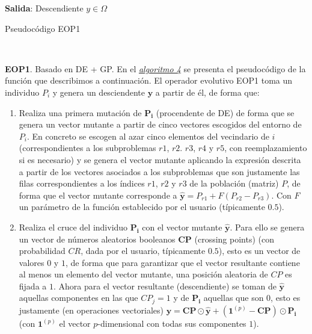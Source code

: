 \begin{minipage}{\textwidth}
\begin{algorithm}[H]
         \vspace{0.2cm}\textbf{Salida}: Descendiente $y \in \Omega$
     \caption{Pseudocódigo EOP1}
     \label{alg:4}
    \end{algorithm}
     \end{minipage}\\ \vspace{0.2cm}
    
    \noindent\textbf{EOP1}. Basado en DE + GP. En el \hyperref[alg:4]{\textit{algoritmo 4}} se presenta el pseudocódigo de la función que describimos a continuación. El operador evolutivo EOP1 toma un individuo $P_i$ y genera un desciendente $\boldsymbol{y}$ a partir de él, de forma que:\\
    
    \begin{enumerate}
        \item Realiza una primera mutación de $\boldsymbol{P_i}$ (procendente de DE) de forma que se genera un vector mutante a partir de cinco vectores escogidos del entorno de $P_i$. En concreto se escogen al azar cinco elementos del vecindario de $i$ (correspondientes a los subproblemas $r1$, $r2$. $r3$, $r4$ y $r5$, con reemplazamiento si es necesario) y se genera el vector mutante aplicando la expresión descrita a partir de los vectores asociados a los subproblemas que son justamente las filas correspondientes a los índices $r1$, $r2$ y $r3$ de la población (matriz) $P$, de forma que el vector mutante corresponde a $\boldsymbol{\hat{y}} = P_{r1} + F (P_{r2} - P_{r3})$. Con $F$ un parámetro de la función establecido por el usuario (típicamente $0.5$). \\
        
        \item Realiza el cruce del individuo $\boldsymbol{P_i}$ con el vector mutante $\boldsymbol{\hat{y}}$. Para ello se genera un vector de números aleatorios booleanos $\boldsymbol{CP}$ (crossing points) (con probabilidad $CR$, dada por el usuario, típicamente $0.5$), esto es un vector de valores $0$ y $1$, de forma que para garantizar que el vector resultante contiene al menos un elemento del vector mutante, una posición aleatoria de $CP$ es fijada a $1$. Ahora para el vector resultante (descendiente) se toman  de $\boldsymbol{\hat{y}}$ aquellas componentes en las que $CP_j = 1$ y de $\boldsymbol{P_i}$ aquellas que son $0$, esto es justamente (en operaciones vectoriales) $\boldsymbol{y} = \boldsymbol{CP} \odot \boldsymbol{\hat{y}} +  (\boldsymbol{1}^{(p)} - \boldsymbol{CP}) \odot \boldsymbol{P_i}$ (con $\boldsymbol{1}^{(p)}$ el vector $p$-dimensional con todas sus componentes  $1$).\\
        

\end{enumerate}
